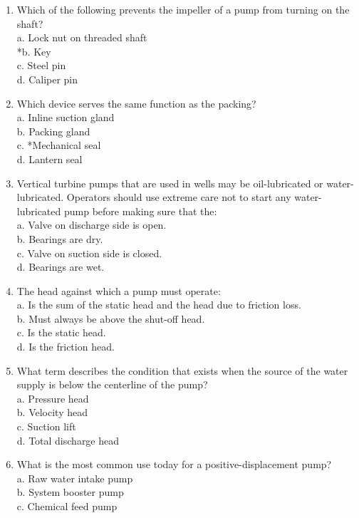 \begin{enumerate}[1.]
\item Which of the following prevents the impeller of a pump from turning on the shaft?\\
a. Lock nut on threaded shaft\\
*b. Key\\
c. Steel pin\\
d. Caliper pin\\
\item Which device serves the same function as the packing?\\
a. Inline suction gland\\
b. Packing gland\\
c. *Mechanical seal\\
d. Lantern seal\\
\item Vertical turbine pumps that are used in wells may be oil-lubricated or water-lubricated. Operators should use extreme care not to start any water-lubricated pump before making sure that the:\\
a. Valve on discharge side is open.\\
b. Bearings are dry.\\
c. Valve on suction side is closed.\\
d. Bearings are wet.\\
\item The head against which a pump must operate:\\
a. Is the sum of the static head and the head due to friction loss.\\
b. Must always be above the shut-off head.\\
c. Is the static head.\\
d. Is the friction head.\\
\item What term describes the condition that exists when the source of the water supply is below the centerline of the pump?\\
a. Pressure head\\
b. Velocity head\\
c. Suction lift\\
d. Total discharge head\\
\item What is the most common use today for a positive-displacement pump?\\
a. Raw water intake pump\\
b. System booster pump\\
c. Chemical feed pump\\

\end{enumerate}
